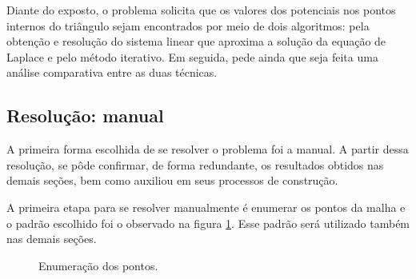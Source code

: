 \documentclass[a4paper,11pt]{article}
\begin{document}
    Diante do exposto, o problema solicita que os valores dos potenciais nos pontos internos do triângulo sejam encontrados por meio de dois algoritmos: pela obtenção e resolução do sistema linear que aproxima a solução da equação de Laplace e pelo método iterativo. Em seguida, pede ainda que seja feita uma análise comparativa entre as duas técnicas.
    
\subsection{Resolução: manual \label{manual}}
    A primeira forma escolhida de se resolver o problema foi a manual. A partir dessa resolução, se pôde confirmar, de forma redundante, os resultados obtidos nas demais seções, bem como auxiliou em seus processos de construção.
    
    A primeira etapa para se resolver manualmente é enumerar os pontos da malha e o padrão escolhido foi o observado na figura \ref{pontos}. Esse padrão será utilizado também nas demais seções. 
    
    \begin{figure}[H]
        \centering
        \caption[width=\columnwidth]{Enumeração dos pontos.}
        \label{pontos}
    \end{figure}
    
\end{document}
